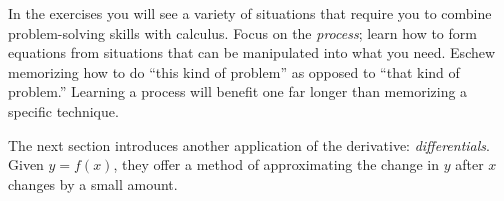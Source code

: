 In the exercises you will see a variety of situations that require you to combine problem-solving skills with calculus. Focus on the \emph{process}; learn how to form equations from situations that can be manipulated into what you need. Eschew memorizing how to do ``this kind of problem'' as opposed to ``that kind of problem.'' Learning a process will benefit one far longer than memorizing a specific technique.

The next section introduces another application of the derivative: \emph{differentials}. Given $y=f(x)$, they offer a method of approximating the change in $y$ after $x$ changes by a small amount. 


